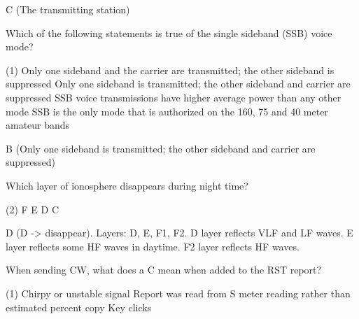 \documentclass[a4paper]{article}
\begin{document}
\begin{solution}
	C (The transmitting station)
\end{solution}

\vspace{5mm}



\begin{question}Which of the following statements is true of the single sideband (SSB) voice mode?
	\begin{tasks}(1)
		\task Only one sideband and the carrier are transmitted; the other sideband is suppressed
		\task Only one sideband is transmitted; the other sideband and carrier are suppressed
		\task SSB voice transmissions have higher average power than any other mode
		\task SSB is the only mode that is authorized on the 160, 75 and 40 meter amateur bands
	\end{tasks}
\end{question}

\begin{solution}
	B (Only one sideband is transmitted; the other sideband and carrier are suppressed)
\end{solution}

\vspace{5mm}



\begin{question}Which layer of ionosphere disappears during night time?
	\begin{tasks}(2)
		\task F
		\task E
		\task D
		\task C
	\end{tasks}
\end{question}

\begin{solution}
	D (D -> disappear). Layers: D, E, F1, F2. D layer reflects VLF and LF waves. E layer reflects some HF waves in daytime. F2 layer reflects HF waves.
\end{solution}

\vspace{5mm}



\begin{question}When sending CW, what does a \apostrophe{}C\apostrophe{} mean when added to the RST report?
	\begin{tasks}(1)
		\task Chirpy or unstable signal
		\task Report was read from S meter reading rather than estimated
		 percent copy
		\task Key clicks
	\end{tasks}
\end{question}
\end{document}

